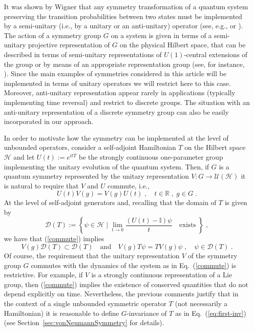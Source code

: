 \documentclass[a4paper,12pt]{amsart}
\renewcommand{\H}{\mathcal{H}}
\newcommand{\D}{\mathcal{D}}
\newcommand{\1}{\mathbb{I}}
\newcommand{\R}{\mathbb{R}}
\numberwithin{equation}{section}
\numberwithin{theorem}{section}
\begin{document}
It was shown by Wigner that any symmetry transformation of a quantum system preserving the transition probabilities
between two states must be implemented by a semi-unitary (i.e., by a unitary or an anti-unitary) operator
(see, e.g., \cite[Introduction]{wigner39} or \cite[Chapters 2]{thaller92}).
The action of a symmetry group $G$ on a system is given in terms of a semi-unitary projective representation 
of $G$ on the physical Hilbert space, that can be described in terms of semi-unitary representations of $U(1)$-central extensions 
of the group or by means of an appropriate representation group (see, for instance, \cite{Bargmann,Santander75,Santander80}).   
Since the main examples of symmetries considered in this article
will be implemented in terms of unitary operators we will restrict here to this case. Moreover, anti-unitary
representation appear rarely in applications (typically implementing time reversal) and restrict to discrete
groups. The situation with an anti-unitary representation of a discrete symmetry group can also be easily incorporated
in our approach. 

In order to motivate how the symmetry can be implemented at the level of unbounded operators, consider
a self-adjoint Hamiltonian $T$ on the Hilbert space $\H$
and let $U(t):=e^{itT}$ be the strongly continuous one-parameter group implementing the unitary evolution
of the quantum system. Then, if $G$ is a quantum symmetry represented by the unitary representation
$V\colon G\to \mathcal{U}(\H)$ it is natural to require that $V$ and $U$ commute, i.e.,
\begin{equation}\label{commute}
 U(t) V(g) = V(g) U(t)\;,\quad t\in\R\;,\; g\in G\;.
\end{equation}
At the level of self-adjoint generators and, recalling that the domain of $T$ is given by
\[
 \D(T):=\left\{ \psi\in\H\mid \lim_{t\to 0}\frac{(U(t)-\1)\psi}{t}\quad\mathrm{exists}\;   \right\}\;,
\]
we have that (\ref{commute}) implies
\begin{equation}\label{eq:first-inv}
 V(g) \D(T) \subset \D(T)\quad\mathrm{and}\quad V(g)T\psi=TV(g)\psi\;,\quad \psi\in \D(T)\;.
\end{equation}
Of course, the requirement that the unitary representation $V$ of the symmetry group $G$ commutes with the 
dynamics of the system as in Eq.~(\ref{commute}) is restrictive. For example, if $V$ is a strongly
continuous representation of a Lie group, then (\ref{commute}) implies
the existence of conserved quantities that do not depend explicitly on 
time. Nevertheless, the previous comments justify that in the context of a single unbounded symmetric 
operator $T$ (not necessarily a Hamiltonian) it is reasonable to define $G$-invariance of $T$ 
as in Eq.~(\ref{eq:first-inv}) (see Section~\ref{sec:vonNeumannSymmetry} for details). 
\end{document}
